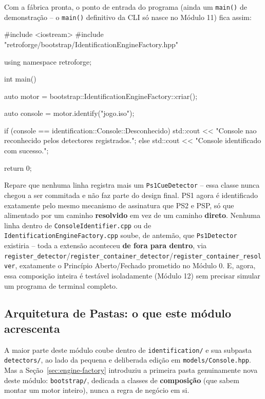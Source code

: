 Com a fábrica pronta, o ponto de entrada do programa (ainda um \texttt{main()} de demonstração -- o \texttt{main()} definitivo da CLI só nasce no Módulo 11) fica assim:

\begin{CaixaCodigo}
#include <iostream>
#include "retroforge/bootstrap/IdentificationEngineFactory.hpp"

using namespace retroforge;

int main() {
    auto motor = bootstrap::IdentificationEngineFactory::criar();

    auto console = motor.identify("jogo.iso");

    if (console == identification::Console::Desconhecido) {
        std::cout << "Console nao reconhecido pelos detectores registrados.\n";
    } else {
        std::cout << "Console identificado com sucesso.\n";
    }

    return 0;
}
\end{CaixaCodigo}

\begin{CaixaInfo}
Repare que nenhuma linha registra mais um \texttt{Ps1CueDetector} -- essa classe nunca chegou a ser commitada e não faz parte do design final. PS1 agora é identificado exatamente pelo mesmo mecanismo de assinatura que PS2 e PSP, só que alimentado por um caminho \textbf{resolvido} em vez de um caminho \textbf{direto}. Nenhuma linha dentro de \texttt{ConsoleIdentifier.cpp} ou de \texttt{IdentificationEngineFactory.cpp} soube, de antemão, que \texttt{Ps1Detector} existiria -- toda a extensão aconteceu \textbf{de fora para dentro}, via \texttt{register\_detector}/\texttt{register\_container\_detector}/\texttt{register\_container\_resolver}, exatamente o Princípio Aberto/Fechado prometido no Módulo 0. E, agora, essa composição inteira é testável isoladamente (Módulo 12) sem precisar simular um programa de terminal completo.
\end{CaixaInfo}

\subsection{Arquitetura de Pastas: o que este módulo acrescenta}

A maior parte deste módulo coube dentro de \texttt{identification/} e sua subpasta \texttt{detectors/}, ao lado da pequena e deliberada edição em \texttt{models/Console.hpp}. Mas a Seção~\ref{sec:engine-factory} introduziu a primeira pasta genuinamente nova deste módulo: \texttt{bootstrap/}, dedicada a classes de \textbf{composição} (que sabem montar um motor inteiro), nunca a regra de negócio em si.

